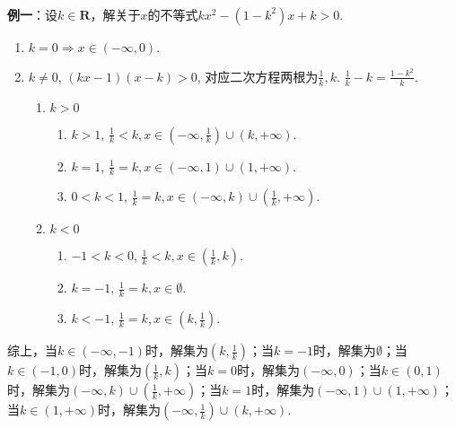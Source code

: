 \documentclass[8pt]{article}
\begin{document}
				~\\

				\textbf{例一}：设$k\in\mathbf{R}$，解关于$x$的不等式$kx^2-(1-k^2)x+k>0$.

					\begin{enumerate}[label=$\arabic*^{\circ}$]
						\item $k=0 \Rightarrow x\in(-\infty, 0).$
						\item $k\neq 0$, $(kx-1)(x-k)>0$, 对应二次方程两根为$\displaystyle \frac{1}{k}, k.$ $\displaystyle \frac{1}{k}-k=\frac{1-k^2}{k}.$
							\begin{enumerate}[label=$2.\arabic*^{\circ}$]
								\item $k>0$
									\begin{enumerate}[label=$2.1.\arabic*^{\circ}$]
										\item $k>1$, $\displaystyle \frac{1}{k}<k, x\in\left(-\infty, \frac{1}{k}\right)\cup\left(k, +\infty\right).$
										\item $k=1$, $\displaystyle \frac{1}{k}=k, x\in\left(-\infty, 1\right)\cup\left(1, +\infty\right).$
										\item $0<k<1$, $\displaystyle \frac{1}{k}=k, x\in\left(-\infty, k\right)\cup\left(\frac{1}{k}, +\infty\right).$
									\end{enumerate}
								\item $k<0$
									\begin{enumerate}[label=$2.2.\arabic*^{\circ}$]
										\item $-1<k<0$, $\displaystyle \frac{1}{k}<k, x\in\left(\frac{1}{k},k\right).$
										\item $k=-1$, $\displaystyle \frac{1}{k}=k, x\in\emptyset.$
										\item $k<-1$, $\displaystyle \frac{1}{k}=k, x\in\left(k, \frac{1}{k}\right).$
									\end{enumerate}
							\end{enumerate}
					\end{enumerate}

					综上，当$k\in(-\infty, -1)$时，解集为$\displaystyle\left(k, \frac{1}{k}\right)$；当$k=-1$时，解集为$\displaystyle\emptyset$；当$k\in(-1, 0)$时，解集为$\displaystyle\left(\frac{1}{k}, k\right)$；当$k=0$时，解集为$\displaystyle\left(-\infty, 0\right)$；当$k\in(0, 1)$时，解集为$\displaystyle \left(-\infty, k\right)\cup\left(\frac{1}{k}, +\infty\right)$；当$k=1$时，解集为$\left(-\infty, 1\right)\cup\left(1, +\infty\right)$；当$k\in(1, +\infty)$时，解集为$\displaystyle \left(-\infty, \frac{1}{k}\right)\cup\left(k, +\infty\right)$.
\end{document}
